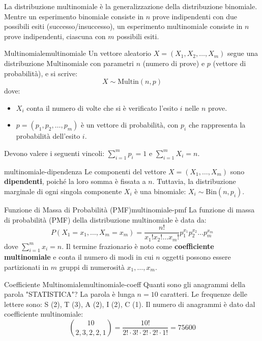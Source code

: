 La distribuzione multinomiale è la generalizzazione della distribuzione
binomiale. Mentre un esperimento binomiale consiste in $n$ prove indipendenti
con due possibili esiti (successo/insuccesso), un esperimento multinomiale
consiste in $n$ prove indipendenti, ciascuna con $m$ possibili esiti.

\begin{definizione}{Multinomiale}{multinomiale}
Un vettore aleatorio $X = (X_1, X_2, \dots, X_m)$ segue una distribuzione
Multinomiale con parametri $n$ (numero di prove) e $p$ (vettore di
probabilità), e si scrive:
$$
X \sim \text{Multin}(n, p)
$$
dove:
\begin{itemize}
    \item $X_i$ conta il numero di volte che si è verificato l'esito $i$ nelle
    $n$ prove.
    \item $p = (p_1, p_2, \dots, p_m)$ è un vettore di probabilità, con $p_i$
    che rappresenta la probabilità dell'esito $i$.
\end{itemize}
Devono valere i seguenti vincoli: $\sum_{i=1}^{m} p_i = 1$ e $\sum_{i=1}^{m} X_i
= n$.
\end{definizione}

\begin{nota}{}{multinomiale-dipendenza}
Le componenti del vettore $X = (X_1, \dots, X_m)$ sono \textbf{dipendenti},
poiché la loro somma è fissata a $n$. Tuttavia, la distribuzione marginale di
ogni singola componente $X_i$ è una binomiale: $X_i \sim \text{Bin}(n, p_i)$.
\end{nota}

\begin{proposizione}{Funzione di Massa di Probabilità (PMF)}{multinomiale-pmf}
La funzione di massa di probabilità (PMF) della distribuzione multinomiale è
data da:
$$
P(X_1=x_1, \dots, X_m=x_m) = \frac{n!}{x_1! x_2! \dots x_m!} p_1^{x_1} p_2^{x_2}
\dots p_m^{x_m}
$$
dove $\sum_{i=1}^{m} x_i = n$. Il termine frazionario è noto come
\textbf{coefficiente multinomiale} e conta il numero di modi in cui $n$ oggetti
possono essere partizionati in $m$ gruppi di numerosità $x_1, \dots, x_m$.
\end{proposizione}

\begin{esempio}{Coefficiente Multinomiale}{multinomiale-coeff}
Quanti sono gli anagrammi della parola "STATISTICA"?
La parola è lunga $n=10$ caratteri. Le frequenze delle lettere sono: S (2), T
(3), A (2), I (2), C (1).
Il numero di anagrammi è dato dal coefficiente multinomiale:
$$
\binom{10}{2, 3, 2, 2, 1} = \frac{10!}{2! \cdot 3! \cdot 2! \cdot 2! \cdot 1!} =
75600
$$
\end{esempio}


